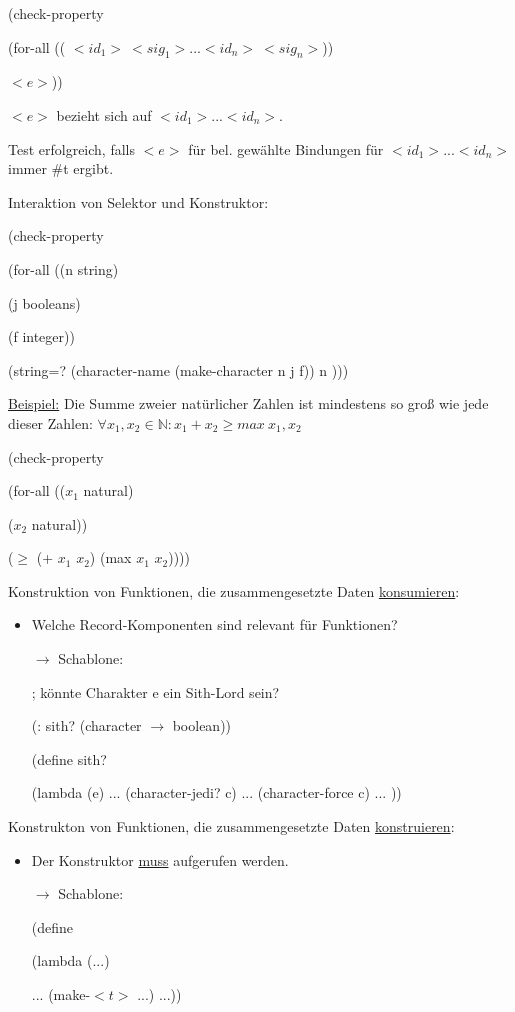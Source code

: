\documentclass[a4paper, 20pt, openany]{book}
\begin{document}
\begin{center}
(check-property

(for-all (( $<id_1> \ <sig_1> ... <id_n> \ <sig_n>$))

$<e>$))
\end{center}
$<e>$ bezieht sich auf $<id_1>... <id_n>$.

Test erfolgreich, falls $<e>$ für bel. gewählte Bindungen für $<id_1>...<id_n>$ immer \#t ergibt.

Interaktion von Selektor und Konstruktor:

\begin{center}
  (check-property
  
  (for-all ((n string)
  
  (j booleans)
  
  (f integer))
  
  (string=? (character-name (make-character n j f)) n )))
\end{center}

\underline{Beispiel:} Die Summe zweier natürlicher Zahlen ist mindestens so groß wie jede dieser Zahlen: $\forall x_1, x_2 \in \mathbb{N} : x_1 + x_2 \geq max \ {x_1, x_2}$

\begin{center}
(check-property

(for-all (($x_1$ natural)

($x_2$ natural))

($\geq$ (+ $x_1$ $x_2$) (max $x_1$ $x_2$))))
\end{center}

Konstruktion von Funktionen, die zusammengesetzte Daten \underline{konsumieren}:

\begin{itemize}
  \item Welche Record-Komponenten sind relevant für Funktionen?
  
  $\rightarrow$ Schablone:
  
  ; könnte Charakter e ein Sith-Lord sein?
  
  (: sith? (character $\rightarrow$ boolean))
  
  (define sith?
  
  (lambda (e) ... (character-jedi? c) ... (character-force c) ... ))
\end{itemize}

Konstrukton von Funktionen, die zusammengesetzte Daten \underline{konstruieren}: 

\begin{itemize}
  \item Der Konstruktor \underline{muss} aufgerufen werden.
  
  $\rightarrow$ Schablone:
  
  (define 
  
  (lambda (...)
  
  ... (make-$<t>$ ...) ...))

\end{itemize}
\end{document}
